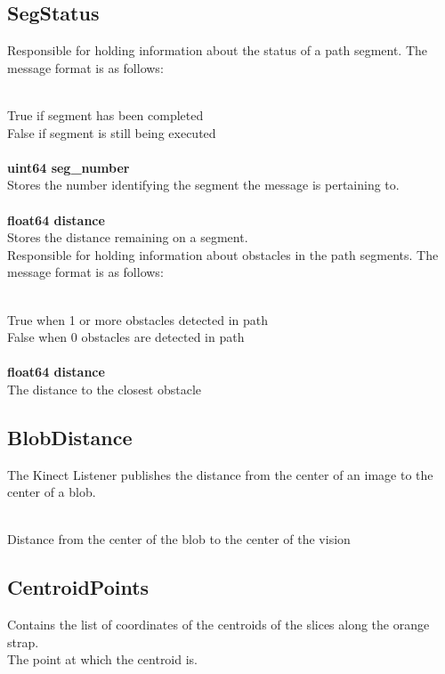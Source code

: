 \subsection{SegStatus}

Responsible for holding information about the status of a path
segment.  The message format is as follows:

\\
\indent True if segment has been completed\\
\indent False if segment is still being executed\\
\\
{\bf uint64 seg\_number}\\
\indent Stores the number identifying the segment the message is
pertaining to.\\
\\
{\bf float64 distance}\\
\indent Stores the distance remaining on a segment.\\


Responsible for holding information about obstacles in the path
segments.  The message format is as follows:

\\
\indent True when 1 or more obstacles detected in path\\
\indent False when 0 obstacles are detected in path\\
\\
{\bf float64 distance}\\
\indent The distance to the closest obstacle

\subsection{BlobDistance}
The Kinect Listener publishes the distance from the center of an image
to the center of a blob.

\\
\indent Distance from the center of the blob to the center of the vision\\

\subsection{CentroidPoints}
Contains the list of coordinates of the centroids of the slices along the orange strap.
\\
\indent {}
\indent The point at which the centroid is.

